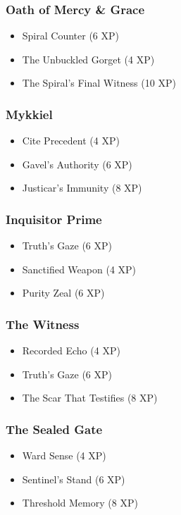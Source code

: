 \subsubsection{Oath of Mercy \& Grace}
\begin{itemize}
\item Spiral Counter (6 XP)
\item The Unbuckled Gorget (4 XP)
\item The Spiral's Final Witness (10 XP)
\end{itemize}

\subsubsection{Mykkiel}
\begin{itemize}
\item Cite Precedent (4 XP)
\item Gavel's Authority (6 XP)
\item Justicar's Immunity (8 XP)
\end{itemize}

\subsubsection{Inquisitor Prime}
\begin{itemize}
\item Truth's Gaze (6 XP)
\item Sanctified Weapon (4 XP)
\item Purity Zeal (6 XP)
\end{itemize}

\subsubsection{The Witness}
\begin{itemize}
\item Recorded Echo (4 XP)
\item Truth's Gaze (6 XP)
\item The Scar That Testifies (8 XP)
\end{itemize}

\subsubsection{The Sealed Gate}
\begin{itemize}
\item Ward Sense (4 XP)
\item Sentinel's Stand (6 XP)
\item Threshold Memory (8 XP)
\end{itemize}


